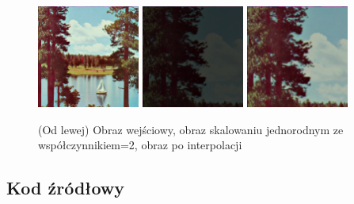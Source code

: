 \documentclass[final,a4paper,openany,12pt]{mwbk}
\begin{document}
\begin{figure}[H]
	\begin{center}
		\includegraphics[width=0.3\textwidth]{2/2Geo_ScaleJ_Original}
		\includegraphics[width=0.3\textwidth]{2/2Geo_ScaleJ_Result}
		\includegraphics[width=0.3\textwidth]{2/2Geo_ScaleJ_Result_Interp}
	\end{center}
	\caption{(Od lewej) Obraz wejściowy, obraz skalowaniu jednorodnym ze współczynnikiem=2, obraz po interpolacji }
\end{figure}

\subsection*{Kod źródłowy}
\end{document}
